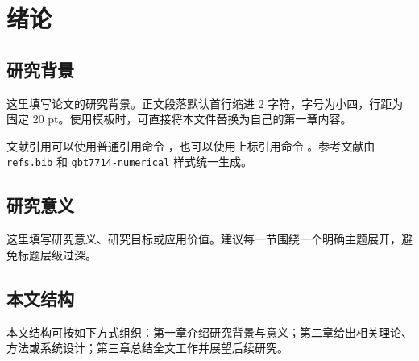 \chapter{绪论}

\section{研究背景}

这里填写论文的研究背景。正文段落默认首行缩进 2 字符，字号为小四，行距为固定 20 pt。使用模板时，可直接将本文件替换为自己的第一章内容。

文献引用可以使用普通引用命令 \cite{hartley2004multiple}，也可以使用上标引用命令 。参考文献由 \texttt{refs.bib} 和 \texttt{gbt7714-numerical} 样式统一生成。

\section{研究意义}

这里填写研究意义、研究目标或应用价值。建议每一节围绕一个明确主题展开，避免标题层级过深。

\section{本文结构}

本文结构可按如下方式组织：第一章介绍研究背景与意义；第二章给出相关理论、方法或系统设计；第三章总结全文工作并展望后续研究。
